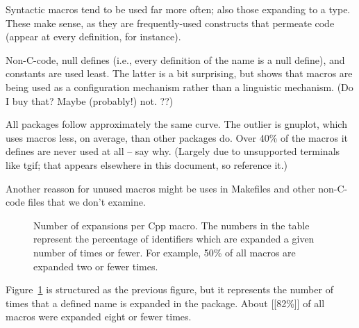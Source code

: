 \documentclass[10pt]{article}
\newcommand{\pkg}[1]{\textsf{#1}}
\begin{document}
        Syntactic macros tend to be used far more often; also those
          expanding to a type.  These make sense, as they are
          frequently-used constructs 
          that permeate code (appear at every definition, for instance).

        Non-C-code, null defines (i.e., every definition of the name is a
          null define), and constants are used least.  The latter is a bit
          surprising, but shows that macros are being used as a
          configuration mechanism rather than a linguistic mechanism.  (Do
          I buy that?  Maybe (probably!) not. ??)

        All packages follow approximately the same curve.  The outlier is
          \pkg{gnuplot}, which uses macros less, on average, than other packages
          do.  Over 40\% of the macros it defines are never used at all --
          say why.  (Largely due to unsupported terminals like tgif; that
          appears elsewhere in this document, so reference it.)

          Another reasson for unused macros might be uses in Makefiles and
          other non-C-code files that we don't examine.



\begin{figure}
\centerline{}
\caption{Number of expansions per Cpp macro.  The numbers in the
  table represent the percentage of identifiers which are expanded a given
  number of times or fewer.  For example, 50\% of all
  macros are expanded two or fewer times.}
\label{fig:freq-use-cat}
\end{figure}

Figure~\ref{fig:freq-use-cat} is structured as the previous figure, but it
represents the number of times that a defined name is expanded in 
the package.  About [[82\%]] of all macros were
expanded eight or fewer times.
\end{document}
